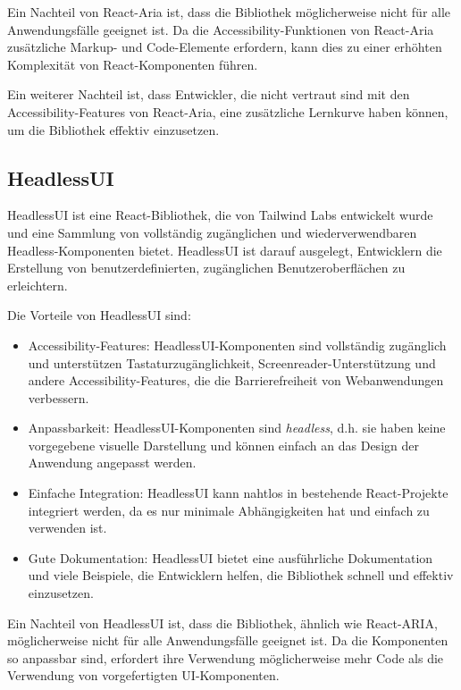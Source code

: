 Ein Nachteil von React-Aria ist, dass die Bibliothek möglicherweise nicht für alle Anwendungsfälle geeignet ist. Da die Accessibility-Funktionen von React-Aria zusätzliche Markup- und Code-Elemente erfordern, kann dies zu einer erhöhten Komplexität von React-Komponenten führen.

Ein weiterer Nachteil ist, dass Entwickler, die nicht vertraut sind mit den Accessibility-Features von React-Aria, eine zusätzliche Lernkurve haben können, um die Bibliothek effektiv einzusetzen.

\subsection{HeadlessUI}

HeadlessUI ist eine React-Bibliothek, die von Tailwind Labs entwickelt wurde und eine Sammlung von vollständig zugänglichen und wiederverwendbaren Headless-Komponenten bietet. HeadlessUI ist darauf ausgelegt, Entwicklern die Erstellung von benutzerdefinierten, zugänglichen Benutzeroberflächen zu erleichtern.

Die Vorteile von HeadlessUI sind:

\begin{itemize}
    \item Accessibility-Features: HeadlessUI-Komponenten sind vollständig zugänglich und unterstützen Tastaturzugänglichkeit, Screenreader-Unterstützung und andere Accessibility-Features, die die Barrierefreiheit von Webanwendungen verbessern.
    \item Anpassbarkeit: HeadlessUI-Komponenten sind \emph{headless}, d.h. sie haben keine vorgegebene visuelle Darstellung und können einfach an das Design der Anwendung angepasst werden.
    \item Einfache Integration: HeadlessUI kann nahtlos in bestehende React-Projekte integriert werden, da es nur minimale Abhängigkeiten hat und einfach zu verwenden ist.
    \item Gute Dokumentation: HeadlessUI bietet eine ausführliche Dokumentation und viele Beispiele, die Entwicklern helfen, die Bibliothek schnell und effektiv einzusetzen.
\end{itemize}

Ein Nachteil von HeadlessUI ist, dass die Bibliothek, ähnlich wie React-ARIA, möglicherweise nicht für alle Anwendungsfälle geeignet ist. Da die Komponenten so anpassbar sind, erfordert ihre Verwendung möglicherweise mehr Code als die Verwendung von vorgefertigten UI-Komponenten.

